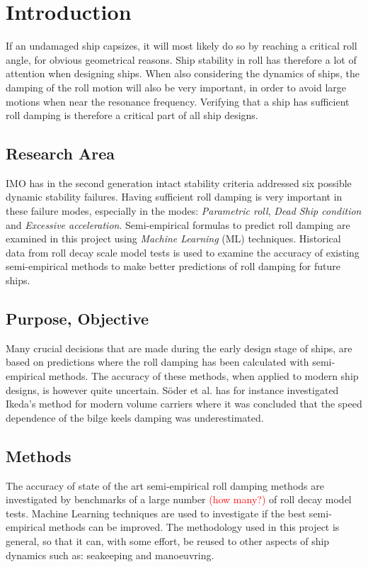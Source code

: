 \section{Introduction}
\label{se:introduction}
If an undamaged ship capsizes, it will most likely do so by reaching a critical roll angle, for obvious geometrical reasons. Ship stability in roll has therefore a lot of attention when designing ships. When also considering the dynamics of ships, the damping of the roll motion will also be very important, in order to avoid large motions when near the resonance frequency. Verifying that a ship has sufficient roll damping is therefore a critical part of all ship designs. 

\subsection{Research Area}
IMO has in the second generation intact stability criteria \cite{imo_second_nodate} addressed six possible dynamic stability failures. Having sufficient roll damping is very important in these failure modes, especially in the modes: \emph{Parametric roll}, \emph{Dead Ship condition} and \emph{Excessive acceleration}. Semi-empirical formulas to predict roll damping are examined in this project using \emph{Machine Learning} (ML) techniques. Historical data from roll decay scale model tests is used to examine the accuracy of existing semi-empirical methods to make better predictions of roll damping for future ships.
		
\subsection{Purpose, Objective}
Many crucial decisions that are made during the early design stage of ships, are based on predictions where the roll damping has been calculated with semi-empirical methods. The accuracy of these methods, when applied to modern ship designs, is however quite uncertain. Söder et al. \cite{soder_ikeda_2019} has for instance investigated Ikeda’s method for modern volume carriers where it was concluded that the speed dependence of the bilge keels damping was underestimated.

\subsection{Methods}
The accuracy of state of the art semi-empirical roll damping methods are investigated by benchmarks of a large number \textcolor{red}{(how many?)} of roll decay model tests. Machine Learning techniques are used to investigate if the best semi-empirical methods can be improved. The methodology used in this project is general, so that it can, with some effort, be reused to other aspects of ship dynamics such as: seakeeping and manoeuvring.

